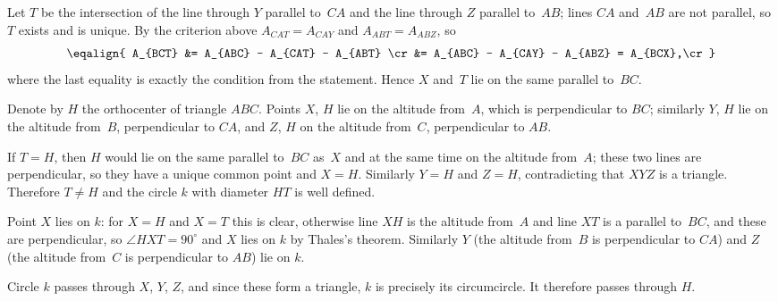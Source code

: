{    Let $T$ be the intersection of the line through $Y$ parallel to~$CA$ and the line through $Z$ parallel to~$AB$; lines $CA$ and~$AB$ are not parallel, so $T$ exists and is unique. By the criterion above $A_{CAT} = A_{CAY}$ and $A_{ABT} = A_{ABZ}$, so
    $$
    \eqalign{
        A_{BCT} &= A_{ABC} - A_{CAT} - A_{ABT} \cr
        &= A_{ABC} - A_{CAY} - A_{ABZ} = A_{BCX},\cr
    }
    $$
    where the last equality is exactly the condition from the statement. Hence $X$ and~$T$ lie on the same parallel to~$BC$.

    Denote by $H$ the orthocenter of triangle $ABC$. Points $X$, $H$ lie on the altitude from~$A$, which is perpendicular to $BC$; similarly $Y$, $H$ lie on the altitude from~$B$, perpendicular to $CA$, and $Z$, $H$ on the altitude from~$C$, perpendicular to $AB$.

    If $T = H$, then $H$ would lie on the same parallel to~$BC$ as~$X$ and at the same time on the altitude from~$A$; these two lines are perpendicular, so they have a unique common point and $X = H$. Similarly $Y = H$ and $Z = H$, contradicting that $XYZ$ is a triangle. Therefore $T \neq H$ and the circle $k$ with diameter $HT$ is well defined.

    Point $X$ lies on $k$: for $X = H$ and $X = T$ this is clear, otherwise line $XH$ is the altitude from~$A$ and line $XT$ is a parallel to~$BC$, and these are perpendicular, so $\angle HXT = 90^\circ$ and $X$ lies on $k$ by Thales's theorem. Similarly $Y$ (the altitude from~$B$ is perpendicular to $CA$) and $Z$ (the altitude from~$C$ is perpendicular to $AB$) lie on $k$.

    Circle $k$ passes through $X$, $Y$, $Z$, and since these form a triangle, $k$ is precisely its circumcircle. It therefore passes through $H$.
}

